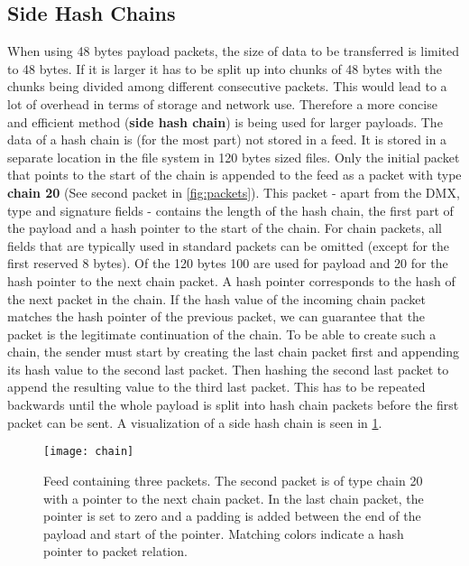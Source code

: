\subsection{Side Hash Chains}
\label{sec:sidechain}
When using 48 bytes payload packets, the size of data to be transferred is limited to 48 bytes. If it is larger it has to be split up into chunks of 48 bytes with the chunks being divided among different consecutive packets. This would lead to a lot of overhead in terms of storage and network use. Therefore a more concise and efficient method (\textbf{side hash chain}) is being used for larger payloads. The data of a hash chain is (for the most part) not stored in a feed. It is stored in a separate location in the file system in 120 bytes sized files. Only the initial packet that points to the start of the chain is appended to the feed as a packet with type \textbf{chain 20} (See second packet in \cref{fig:packets}). This packet - apart from the DMX, type and signature fields - contains the length of the hash chain, the first part of the payload and a hash pointer to the start of the chain. For chain packets, all fields that are typically used in standard packets can be omitted (except for the first reserved 8 bytes). Of the 120 bytes 100 are used for payload and 20 for the hash pointer to the next chain packet. A hash pointer corresponds to the hash of the next packet in the chain. If the hash value of the incoming chain packet matches the hash pointer of the previous packet, we can guarantee that the packet is the legitimate continuation of the chain. To be able to create such a chain, the sender must start by creating the last chain packet first and appending its hash value to the second last packet. Then hashing the second last packet to append the resulting value to the third last packet. This has to be repeated backwards until the whole payload is split into hash chain packets before the first packet can be sent. A visualization of a side hash chain is seen in \cref{fig:chain}. \\
\begin{figure}
\centering
\texttt{[image: chain]}
\caption{Feed containing three packets. The second packet is of type chain 20 with a pointer to the next chain packet. In the last chain packet, the pointer is set to zero and a padding is added between the end of the payload and start of the pointer. Matching colors indicate a hash pointer to packet relation.}
\label{fig:chain}
\end{figure}

